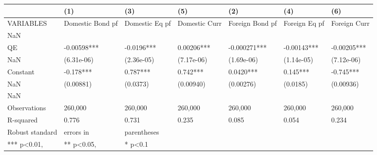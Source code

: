 \begin{tabular}{lllllll}
\toprule
{} &               (1) &             (3) &            (5) &              (2) &            (4) &           (6) \\
\midrule
VARIABLES        &  Domestic Bond pf &  Domestic Eq pf &  Domestic Curr &  Foreign Bond pf &  Foreign Eq pf &  Foreign Curr \\
NaN              &                   &                 &                &                  &                &               \\
QE               &       -0.00598*** &      -0.0196*** &     0.00206*** &     -0.000271*** &    -0.00143*** &   -0.00205*** \\
NaN              &        (6.31e-06) &      (2.36e-05) &     (7.17e-06) &       (1.69e-06) &     (1.14e-05) &    (7.12e-06) \\
Constant         &         -0.178*** &        0.787*** &       0.742*** &        0.0420*** &       0.145*** &     -0.745*** \\
NaN              &         (0.00881) &        (0.0373) &      (0.00940) &        (0.00276) &       (0.0185) &     (0.00936) \\
NaN              &                   &                 &                &                  &                &               \\
Observations     &           260,000 &         260,000 &        260,000 &          260,000 &        260,000 &       260,000 \\
R-squared        &             0.776 &           0.731 &          0.235 &            0.085 &          0.054 &         0.234 \\
Robust standard  &        errors in  &     parentheses &                &                  &                &               \\
*** p<0.01,      &       ** p<0.05,  &         * p<0.1 &                &                  &                &               \\
\bottomrule
\end{tabular}
